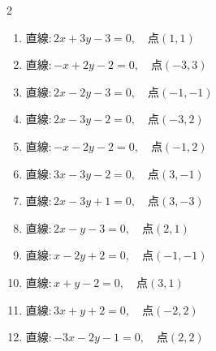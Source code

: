 \begin{multicols}{2}
\begin{enumerate}
  \item $直線:2x+3y-3=0,\quad 点 ( 1, 1 )$


  \item $直線:-x+2y-2=0,\quad 点 ( -3, 3 )$


  \item $直線:2x-2y-3=0,\quad 点 ( -1, -1 )$


  \item $直線:2x-3y-2=0,\quad 点 ( -3, 2 )$


  \item $直線:-x-2y-2=0,\quad 点 ( -1, 2 )$


  \item $直線:3x-3y-2=0,\quad 点 ( 3, -1 )$


  \item $直線:2x-3y+1=0,\quad 点 ( 3, -3 )$


  \item $直線:2x-y-3=0,\quad 点 ( 2, 1 )$

        \phantom{$\displaystyle 距離 : 0$}

  \item $直線:x-2y+2=0,\quad 点 ( -1, -1 )$


  \item $直線:x+y-2=0,\quad 点 ( 3, 1 )$


\columnbreak %

  \item $直線:3x+y+2=0,\quad 点 ( -2, 2 )$


  \item $直線:-3x-2y-1=0,\quad 点 ( 2, 2 )$


\end{enumerate}
\end{multicols}

